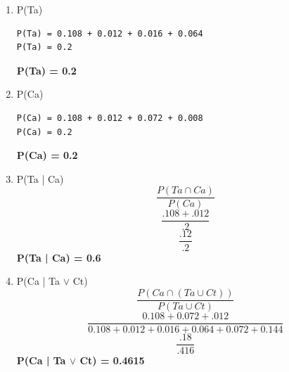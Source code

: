 \documentclass[fontsize=10pt]{scrartcl}
\begin{document}
	\begin{enumerate}
		\item
		P(Ta) \\
\begin{verbatim}
P(Ta) = 0.108 + 0.012 + 0.016 + 0.064
P(Ta) = 0.2
\end{verbatim}
		\textbf{P(Ta) = 0.2}

		\item
		P(Ca) \\
\begin{verbatim}
P(Ca) = 0.108 + 0.012 + 0.072 + 0.008
P(Ca) = 0.2
\end{verbatim}
		\textbf{P(Ca) = 0.2}
		\item
		P(Ta | Ca) \\
		\begin{equation*}
			\frac{P(Ta \cap Ca)}{P(Ca)}
		\end{equation*}
		\begin{equation*}
			\frac{.108 + .012}{.2}
		\end{equation*}
		\begin{equation*}
			\frac{.12}{.2}
		\end{equation*}
		\textbf{P(Ta | Ca) = 0.6}

		\item
		P(Ca | Ta $\vee$ Ct)
		\begin{equation*}
			\frac{P(Ca \cap (Ta \cup Ct))}{P(Ta \cup Ct)}
		\end{equation*}
		\begin{equation*}
			\frac{0.108 + 0.072 + .012}{0.108 + 0.012 + 0.016 + 0.064 + 0.072 + 0.144}
		\end{equation*}
		\begin{equation*}
			\frac{.18}{.416}
		\end{equation*}
		\textbf{P(Ca | Ta $\vee$ Ct) = 0.4615}
	\end{enumerate}
\end{document}
